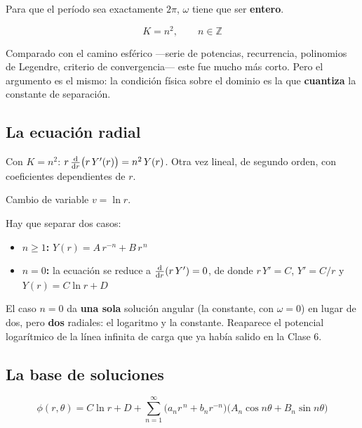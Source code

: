 \documentclass[12pt,a4paper]{article}
\begin{document}
Para que el período sea exactamente $2\pi$, $\omega$ tiene que ser
\textbf{entero}.

\[
\boxed{\;K = n^2, \qquad n \in \mathbb{Z}\;}
\]

\begin{notebox}
Comparado con el camino esférico ---serie de potencias, recurrencia, polinomios de
Legendre, criterio de convergencia--- este fue mucho más corto. Pero el argumento
es el mismo: la condición física sobre el dominio es la que \textbf{cuantiza} la
constante de separación.
\end{notebox}

\subsection{La ecuación radial}

Con $K = n^2$: \quad $r\,\dv{r}\big(r\,Y'(r)\big) = n^2\,Y(r)$. \quad Otra vez
lineal, de segundo orden, con coeficientes dependientes de $r$.

\begin{notebox}
Cambio de variable $v = \ln r$.
\end{notebox}

Hay que separar dos casos:

\begin{itemize}[leftmargin=*]
  \item \textbf{$n \ge 1$:} \quad $Y(r) = A\,r^{-n} + B\,r^{\,n}$
  \item \textbf{$n = 0$:} la ecuación se reduce a $\dv{r}(r\,Y') = 0$, de donde
        $r\,Y' = C$, $Y' = C/r$ y \quad $Y(r) = C\ln r + D$
\end{itemize}

\begin{notebox}
El caso $n=0$ da \textbf{una sola} solución angular (la constante, con
$\omega=0$) en lugar de dos, pero \textbf{dos} radiales: el logaritmo y la
constante. Reaparece el potencial logarítmico de la línea infinita de carga que ya
había salido en la Clase 6.
\end{notebox}

\subsection{La base de soluciones}

\[
\boxed{\;\phi(r,\theta) = C\ln r + D
+ \sum_{n=1}^{\infty}\Big(a_n r^{\,n} + b_n r^{-n}\Big)
  \Big(A_n\cos n\theta + B_n\sin n\theta\Big)\;}
\]
\end{document}
